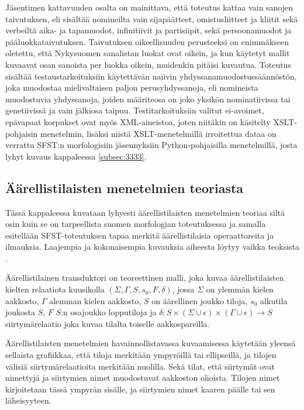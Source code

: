 \documentclass[free]{flammie}
\begin{document}
Jäsentimen kattavuuden osalta on mainittava, että toteutus kattaa vain sanojen taivutuksen, eli sisältää nomineilta vain sijapäätteet, omistusliitteet ja kliitit sekä verbeiltä aika- ja tapamuodot, infinitiivit ja partisiipit, sekä persoonamuodot ja pääluokkataivutuksen. Taivutuksen oikeellisuuden perusteeksi on enimmäkseen oletettu, että Nykysuomen sanalistan luokat ovat oikein, ja kun käytetyt mallit kuvaavat osan sanoista per luokka oikein, muidenkin pitäisi kuvautua. Toteutus sisältää testaustarkoituksiin käytettävän naiivin yhdyssanamuodostussäännöstön, joka
muodostaa mielivaltaisen paljon perusyhdyssanoja, eli nomineista muodostuvia
yhdyssanoja, joiden määriteosa on joko yksikön nominatiivissa tai genetiivissä ja
vain jälkiosa taipuu.
Testitarkoituksiin valitut ei-avoimet, epävapaat korpukset ovat myös XML-aineistoa, joten niitäkin on käsitelty XSLT-pohjaisin menetelmin, lisäksi niistä
XSLT-menetelmillä irroitettua dataa on verrattu SFST:n morfologisiin
jäsennyksiin Python-pohjaisilla menetelmillä, josta lyhyt kuvaus kappaleessa
\ref{subsec:3333}.



\subsection{Äärellistilaisten menetelmien teoriasta} \label{subsec:fsa}

Tässä kappaleessa kuvataan lyhyesti äärellistilaisten menetelmien teoriaa siltä
osin kuin se on tarpeellista suomen morfologian toteutuksessa ja samalla esitellään SFST-toteutuksen tapaa merkitä äärellistilaisia operaattoreita ja ilmauksia.
Laajempia ja kokonaisempia kuvauksia aiheesta löytyy vaikka teoksista
\cite{aho2007compiler,beesley2004finite}.

Äärellistilainen transduktori on teoreettinen malli, joka kuvaa äärellistilaisten
kielten relaatiota kuusikolla
$(\Sigma, \Gamma, S, s_0 , F, \delta)$, jossa $\Sigma$ on ylemmän kielen
aakkosto, $\Gamma$ alemman
kielen aakkosto, $S$ on äärellinen joukko tiloja, $s_0$ alkutila joukosta
$S$, $F$ $S$:n osajoukko lopputiloja ja $\delta : S × (\Sigma ∪ \epsilon) ×
(\Gamma ∪ \epsilon) → S$ siirtymärelaatio
joka kuvaa tilalta toiselle aakkospareilla. \cite{jurafsky2000speech}

Äärellistilaisten menetelmien havainnollistavassa kuvaamisessa käytetään yleensä
sellaista grafiikkaa, että tiloja merkitään ympyröillä tai ellipseillä, ja tilojen välisiä
siirtymärelaatioita merkitään nuolilla. Sekä tilat, että siirtymät ovat nimettyjä ja
siirtymien nimet muodostuvat aakkoston olioista. Tilojen nimet kirjoitetaan tässä
ympyrän sisälle, ja siirtymien nimet kaaren päälle tai sen läheisyyteen.
\end{document}
